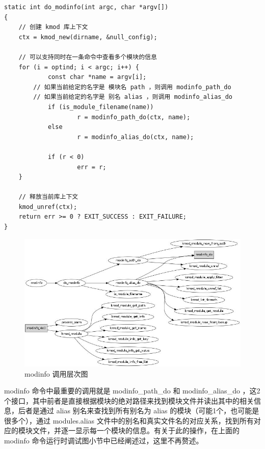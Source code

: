 {\begin{shaded}\begin{verbatim}
static int do_modinfo(int argc, char *argv[])
{
    // 创建 kmod 库上下文
    ctx = kmod_new(dirname, &null_config);

    // 可以支持同时在一条命令中查看多个模块的信息
    for (i = optind; i < argc; i++) {
            const char *name = argv[i];
        // 如果当前给定的名字是 模块名 path ，则调用 modinfo_path_do
        // 如果当前给定的名字是 别名 alias ，则调用 modinfo_alias_do
            if (is_module_filename(name))
                    r = modinfo_path_do(ctx, name);
            else 
                    r = modinfo_alias_do(ctx, name);

            if (r < 0)
                    err = r;
    }   

    // 释放当前库上下文
    kmod_unref(ctx);
    return err >= 0 ? EXIT_SUCCESS : EXIT_FAILURE;
}
\end{verbatim}\end{shaded}}
\begin{figure}[htbp]
\centering
\includegraphics{./figures/modinfo.jpg}
\caption{modinfo 调用层次图}
\end{figure}

modinfo 命令中最重要的调用就是 modinfo\_path\_do 和 modinfo\_alias\_do
，这2个接口，其中前者是直接根据模块的绝对路径来找到模块文件并读出其中的相关信息，后者是通过
alias 别名来查找到所有别名为 alias 的模块（可能1个，也可能是很多个），通过
modules.alias
文件中的别名和真实文件名的对应关系，找到所有对应的模块文件，并逐一显示每一个模块的信息。有关于此的操作，在上面的
modinfo 命令运行时调试图小节中已经阐述过，这里不再赘述。

